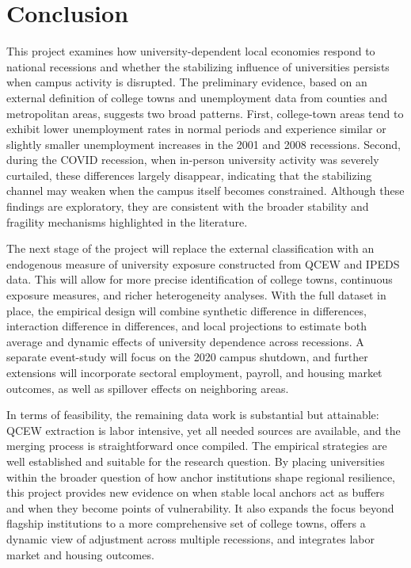 
\section{ Conclusion}

\noindent This project examines how university-dependent local economies respond to national recessions and whether the stabilizing influence of universities persists when campus activity is disrupted. The preliminary evidence, based on an external definition of college towns and unemployment data from counties and metropolitan areas, suggests two broad patterns. First, college-town areas tend to exhibit lower unemployment rates in normal periods and experience similar or slightly smaller unemployment increases in the 2001 and 2008 recessions. Second, during the COVID recession, when in-person university activity was severely curtailed, these differences largely disappear, indicating that the stabilizing channel may weaken when the campus itself becomes constrained. Although these findings are exploratory, they are consistent with the broader stability and fragility mechanisms highlighted in the literature.

The next stage of the project will replace the external classification with an endogenous measure of university exposure constructed from QCEW and IPEDS data. This will allow for more precise identification of college towns, continuous exposure measures, and richer heterogeneity analyses. With the full dataset in place, the empirical design will combine synthetic difference in differences, interaction difference in differences, and local projections to estimate both average and dynamic effects of university dependence across recessions. A separate event-study will focus on the 2020 campus shutdown, and further extensions will incorporate sectoral employment, payroll, and housing market outcomes, as well as spillover effects on neighboring areas.

In terms of feasibility, the remaining data work is substantial but attainable: QCEW extraction is labor intensive, yet all needed sources are available, and the merging process is straightforward once compiled. The empirical strategies are well established and suitable for the research question. By placing universities within the broader question of how anchor institutions shape regional resilience, this project provides new evidence on when stable local anchors act as buffers and when they become points of vulnerability. It also expands the focus beyond flagship institutions to a more comprehensive set of college towns, offers a dynamic view of adjustment across multiple recessions, and integrates labor market and housing outcomes.






